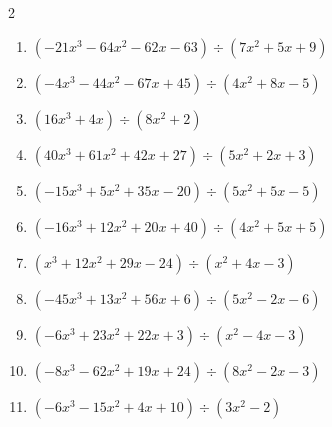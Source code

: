 \begin{multicols}{2}
\begin{enumerate}
  \item $(-21x^{3}-64x^{2}-62x-63) \div (7x^{2}+5x+9)$

        \phantom{$商 : -3x-7, \quad 剰余 : 9x+7$}

  \item $(-4x^{3}-44x^{2}-67x+45) \div (4x^{2}+8x-5)$

        \phantom{$商 : -x-9, \quad 剰余 : -5x-9$}

  \item $(16x^{3}+4x) \div (8x^{2}+2)$

        \phantom{$商 : 2x, \quad 剰余 : x-4$}

  \item $(40x^{3}+61x^{2}+42x+27) \div (5x^{2}+2x+3)$

        \phantom{$商 : 8x+9, \quad 剰余 : -5x-4$}

  \item $(-15x^{3}+5x^{2}+35x-20) \div (5x^{2}+5x-5)$

        \phantom{$商 : -3x+4, \quad 剰余 : 5x+2$}

\columnbreak %

  \item $(-16x^{3}+12x^{2}+20x+40) \div (4x^{2}+5x+5)$

        \phantom{$商 : -4x+8, \quad 剰余 : 7$}

  \item $(x^{3}+12x^{2}+29x-24) \div (x^{2}+4x-3)$

        \phantom{$商 : x+8, \quad 剰余 : -2x$}

  \item $(-45x^{3}+13x^{2}+56x+6) \div (5x^{2}-2x-6)$

        \phantom{$商 : -9x-1, \quad 剰余 : 2x+4$}

  \item $(-6x^{3}+23x^{2}+22x+3) \div (x^{2}-4x-3)$

        \phantom{$商 : -6x-1, \quad 剰余 : -8x+9$}

  \item $(-8x^{3}-62x^{2}+19x+24) \div (8x^{2}-2x-3)$

        \phantom{$商 : -x-8, \quad 剰余 : 8x-1$}

\columnbreak %

\resetques

  \item $(-6x^{3}-15x^{2}+4x+10) \div (3x^{2}-2)$

        \phantom{$商 : -2x-5, \quad 剰余 : 4x-2$}


\end{enumerate}
\end{multicols}
